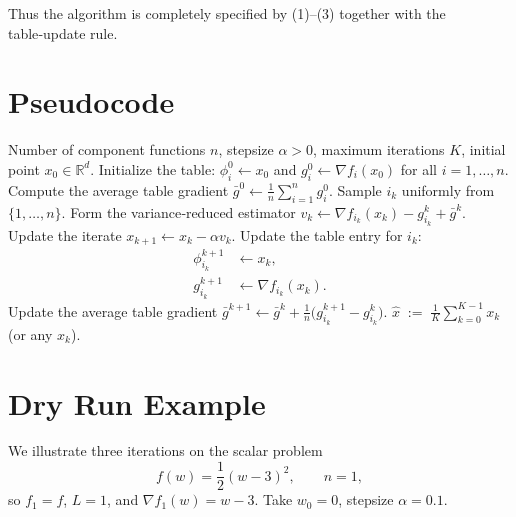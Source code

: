 \documentclass{article}
\newcommand{\RR}{\mathbb{R}}
\begin{document}
Thus the algorithm is completely specified by (1)–(3) together with the
table‑update rule.

\section*{Pseudocode}
\begin{algorithm}[H]
\caption{SAGA for Non‑Convex Smooth Finite‑Sum}
\begin{algorithmic}[1]
\Require Number of component functions $n$, stepsize $\alpha>0$, 
        maximum iterations $K$, initial point $x_{0}\in\RR^{d}$.
\State Initialize the table: $\phi_i^{0}\gets x_{0}$ and 
        $g_i^{0}\gets \nabla f_i(x_{0})$ for all $i=1,\dots,n$.
\State Compute the average table gradient 
        $\displaystyle \bar g^{0}\gets \frac1n\sum_{i=1}^{n} g_i^{0}$.
    \State Sample $i_k$ uniformly from $\{1,\dots,n\}$.
    \State Form the variance‑reduced estimator
          $v_k\gets \nabla f_{i_k}(x_k)-g_{i_k}^{k}+ \bar g^{k}$.
    \State Update the iterate
          $x_{k+1}\gets x_k-\alpha v_k$.
    \State Update the table entry for $i_k$:
          \begin{align*}
                \phi_{i_k}^{k+1}&\gets x_k,\\
                g_{i_k}^{k+1}&\gets \nabla f_{i_k}(x_k).
          \end{align*}
    \State Update the average table gradient
          $\displaystyle \bar g^{k+1}\gets \bar g^{k}
                +\frac{1}{n}\bigl(g_{i_k}^{k+1}-g_{i_k}^{k}\bigr)$.
\EndFor
\State \Return $\displaystyle \hat x \;:=\; \frac1K\sum_{k=0}^{K-1}x_k$ (or any $x_k$).
\end{algorithmic}
\end{algorithm}
\section*{Dry Run Example}
We illustrate three iterations on the scalar problem
\[
f(w)=\frac{1}{2}(w-3)^2,\qquad n=1,
\]
so $f_1=f$, $L=1$, and $\nabla f_1(w)=w-3$.
Take $w_0=0$, stepsize $\alpha=0.1$.
\end{document}
